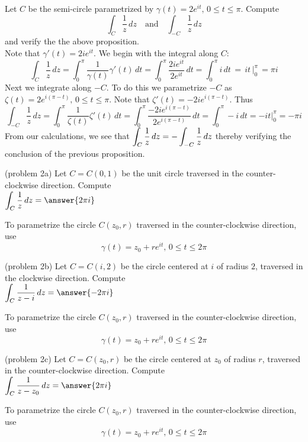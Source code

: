 \documentclass[handout]{ximera}
\begin{document}
\begin{example}[example 2]
Let $C$ be the semi-circle parametrized by $\gamma(t) = 2e^{it}, \, 0\leq t \leq \pi$. Compute
\[
\int_C \frac{1}{z} \, dz \quad \text{and} \quad \int_{-C }\frac{1}{z} \, dz
\]
and verify the the above proposition.\\
Note that $\gamma'(t) = 2ie^{it}$. We begin with the integral along $C$:
\[
\int_C \frac{1}{z} \, dz = \int_0^\pi \frac{1}{\gamma(t)} \gamma'(t) \, dt = \int_0^\pi \frac{2ie^{it}}{2e^{it}} \, dt
                        =\int_0^\pi i \, dt \,= \, it\, \bigg|_0^\pi \, = \pi i
\]
Next we integrate along $-C$.  To do this we parametrize $-C$ as $\zeta(t) = 2e^{i(\pi - t)}, \, 0\leq t \leq \pi$.
Note that $\zeta'(t) = -2ie^{i(\pi - t)}$. Thus
\[
\int_{-C} \frac{1}{z} \, dz = \int_0^\pi \frac{1}{\zeta(t)} \zeta'(t) \, dt = \int_0^\pi \frac{-2ie^{i(\pi-t)}}{2e^{i(\pi -t)}} \, dt
                        =\int_0^\pi -i \, dt
                        = -it \bigg|_0^\pi
                        = -\pi i
\]
From our calculations, we see that $\displaystyle \int_C \frac{1}{z} \, dz = -\int_{-C} \frac{1}{z} \, dz$
thereby verifying the conclusion of the previous proposition.
\end{example}


\begin{problem}(problem 2a)
Let $C= C(0, 1)$ be the unit circle traversed in the counter-clockwise direction. Compute \\
$\dis \int_C \frac{1}{z} \, dz = \answer{2\pi i} $\\
\begin{hint}
To parametrize the circle $C(z_0, r)$ traversed in the counter-clockwise direction, use
\[
\gamma(t) = z_0 + re^{it}, \, 0 \leq t \leq 2\pi
\]
\end{hint}
\end{problem}

\begin{problem}(problem 2b)
Let $C= C(i, 2)$ be the circle centered at $i$ of radius $2$, traversed in the clockwise direction. Compute \\
$\dis \int_C \frac{1}{z-i} \, dz = \answer{-2\pi i} $\\
\begin{hint}
To parametrize the circle $C(z_0, r)$ traversed in the counter-clockwise direction, use
\[
\gamma(t) = z_0 + re^{it}, \, 0 \leq t \leq 2\pi
\]
\end{hint}
\end{problem}

\begin{problem}(problem 2c)
Let $C= C(z_0, r)$ be the circle centered at $z_0$ of radius $r$, traversed in the counter-clockwise direction. Compute \\
$\dis \int_C \frac{1}{z-z_0} \, dz = \answer{2\pi i} $\\
\begin{hint}
To parametrize the circle $C(z_0, r)$ traversed in the counter-clockwise direction, use
\[
\gamma(t) = z_0 + re^{it}, \, 0 \leq t \leq 2\pi
\]
\end{hint}
\end{problem}
\end{document}
